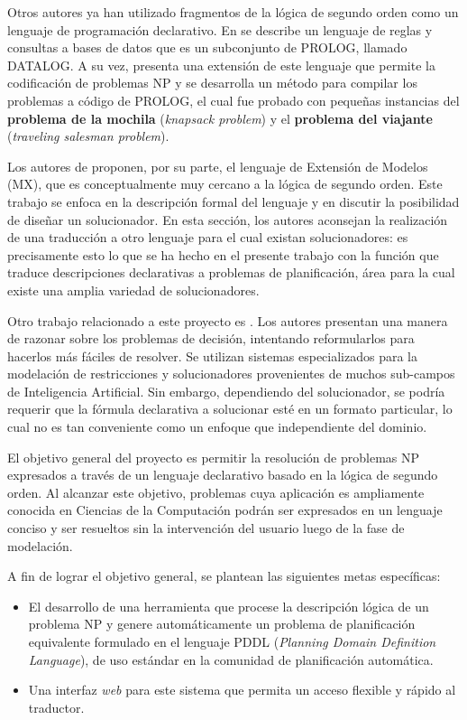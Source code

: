 Otros autores ya han utilizado fragmentos de la lógica de segundo orden como un lenguaje de
programación declarativo. En \cite{reiter:cwa} se describe un
lenguaje de reglas y consultas a bases de datos que es un subconjunto de
PROLOG, llamado DATALOG. A su vez, \cite{cadoli:npspec} presenta una
extensión de este lenguaje que permite la codificación de problemas NP y
se desarrolla un método para compilar los problemas a código de PROLOG, el cual
fue probado con pequeñas instancias del \textbf{problema de la mochila}
(\textit{knapsack problem}) y el \textbf{problema del viajante}
(\textit{traveling salesman problem}).

Los autores de \cite{mitchell:npsearch} proponen, por su parte, el lenguaje de
Extensión de Modelos (MX), que es conceptualmente muy cercano a la lógica de
segundo orden. Este trabajo se enfoca en la descripción formal del lenguaje y
en discutir la posibilidad de diseñar un solucionador. En esta sección, los
autores aconsejan la realización de una traducción a otro lenguaje para el cual
existan solucionadores: es precisamente esto lo que se ha hecho en el presente
trabajo con la función que traduce descripciones declarativas a problemas
de planificación, área para la cual existe una amplia variedad de solucionadores.

Otro trabajo relacionado a este proyecto es \cite{cadoli:safedelay}. Los
autores presentan una manera de razonar sobre los problemas de
decisión, intentando reformularlos para hacerlos más fáciles de resolver. Se
utilizan sistemas especializados para la modelación de restricciones y
solucionadores provenientes de muchos sub-campos de Inteligencia Artificial.
Sin embargo, dependiendo del solucionador, se podría requerir que la fórmula
declarativa a solucionar esté en un formato particular, lo cual no es tan
conveniente como un enfoque que independiente del dominio.

El objetivo general del proyecto es permitir la resolución de problemas
NP expresados a través de un lenguaje declarativo basado en la lógica
de segundo orden. Al alcanzar este objetivo, problemas cuya aplicación es
ampliamente conocida en Ciencias de la Computación podrán ser expresados
en un lenguaje conciso y ser resueltos sin la intervención del usuario luego de
la fase de modelación.

A fin de lograr el objetivo general, se plantean las siguientes metas
específicas:
\begin{itemize}
\item El desarrollo de una herramienta que procese la descripción lógica de un problema 
NP y genere automáticamente un problema de planificación equivalente 
formulado en el lenguaje PDDL (\textit{Planning Domain Definition Language}),
de uso estándar en la comunidad de planificación automática.
\item Una interfaz \textit{web} para este sistema que permita un acceso flexible
y rápido al traductor.
\end{itemize}

